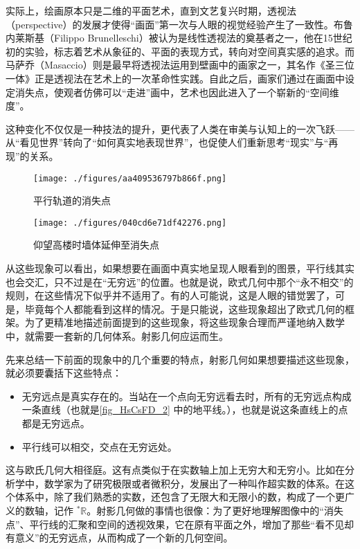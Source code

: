 实际上，绘画原本只是二维的平面艺术，直到文艺复兴时期，透视法（perspective）的发展才使得“画面”第一次与人眼的视觉经验产生了一致性。布鲁内莱斯基（Filippo Brunelleschi）被认为是线性透视法的奠基者之一，他在15世纪初的实验，标志着艺术从象征的、平面的表现方式，转向对空间真实感的追求。而马萨乔（Masaccio）则是最早将透视法运用到壁画中的画家之一，其名作《圣三位一体》正是透视法在艺术上的一次革命性实践。自此之后，画家们通过在画面中设定消失点，使观者仿佛可以“走进”画中，艺术也因此进入了一个崭新的“空间维度”。

这种变化不仅仅是一种技法的提升，更代表了人类在审美与认知上的一次飞跃——从“看见世界”转向了“如何真实地表现世界”，也促使人们重新思考“现实”与“再现”的关系。


\begin{figure}[ht]
\centering
\texttt{[image: ./figures/aa409536797b866f.png]}
\caption{平行轨道的消失点} \label{fig_HsCsFD_2}
\end{figure}

\begin{figure}[ht]
\centering
\texttt{[image: ./figures/040cd6e71df42276.png]}
\caption{仰望高楼时墙体延伸至消失点} \label{fig_HsCsFD_3}
\end{figure}

从这些现象可以看出，如果想要在画面中真实地呈现人眼看到的图景，平行线其实也会交汇，只不过是在“无穷远”的位置。也就是说，欧式几何中那个“永不相交”的规则，在这些情况下似乎并不适用了。有的人可能说，这是人眼的错觉罢了，可是，毕竟每个人都能看到这样的情况。于是只能说，这些现象超出了欧式几何的框架。为了更精准地描述前面提到的这些现象，将这些现象合理而严谨地纳入数学中，就需要一套新的几何体系。射影几何应运而生。

先来总结一下前面的现象中的几个重要的特点，射影几何如果想要描述这些现象，就必须要囊括下这些特点：
\begin{itemize}
\item 无穷远点是真实存在的。当站在一个点向无穷远看去时，所有的无穷远点构成一条直线（也就是\autoref{fig_HsCsFD_2} 中的地平线。），也就是说这条直线上的点都是无穷远点。
\item 平行线可以相交，交点在无穷远处。
\end{itemize}

这与欧氏几何大相径庭。这有点类似于在实数轴上加上无穷大和无穷小。比如在分析学中，数学家为了研究极限或者微积分，发展出了一种叫作超实数的体系。在这个体系中，除了我们熟悉的实数，还包含了无限大和无限小的数，构成了一个更广义的数轴，记作 $^*\mathbb{R}$。射影几何做的事情也很像：为了更好地理解图像中的“消失点”、平行线的汇聚和空间的透视效果，它在原有平面之外，增加了那些“看不见却有意义”的无穷远点，从而构成了一个新的几何空间。


